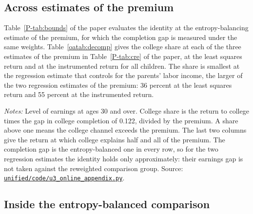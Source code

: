 \documentclass[11pt]{article}
\numberwithin{equation}{section}
\newcommand{\repourl}{https://github.com/JiachenJin1001/before-the-labor-market-or-inside-it}
\newcommand{\code}[1]{\href{\repourl/blob/main/#1}{\nolinkurl{#1}}}
\begin{document}
\subsection{Across estimates of the premium}

Table~\ref{P-tab:bounds} of the paper evaluates the identity at the
entropy-balancing estimate of the premium, for which the completion gap
is measured under the same weights. Table~\ref{oatab:decomp} gives the
college share at each of the three estimates of the premium in
Table~\ref{P-tab:cre} of the paper, at the least squares return and at
the instrumented return for all children. The share is smallest at the
regression estimate that controls for the parents' labor income, the larger of the two regression estimates of the premium: 36 percent at the least
squares return and 55 percent at the instrumented return.

\begin{table}[H]
\centering
\small
\caption{The college share of the premium across estimates of the
premium.}
\label{oatab:decomp}
\setlength{\tabcolsep}{4pt}

\par\smallskip
\begin{minipage}{0.94\textwidth}
\footnotesize\emph{Notes:} Level of earnings at ages 30 and over. College share is the
return to college times the gap in college completion of 0.122,
divided by the premium. A share above one means the college channel
exceeds the premium. The last two columns give the return at which college explains half and all of the premium. The completion gap is the entropy-balanced one in every row, so for the two regression estimates the identity holds only approximately: their earnings gap is not taken against the reweighted comparison group. Source: \code{unified/code/u3_online_appendix.py}.
\end{minipage}
\end{table}

\subsection{Inside the entropy-balanced comparison}
\end{document}

